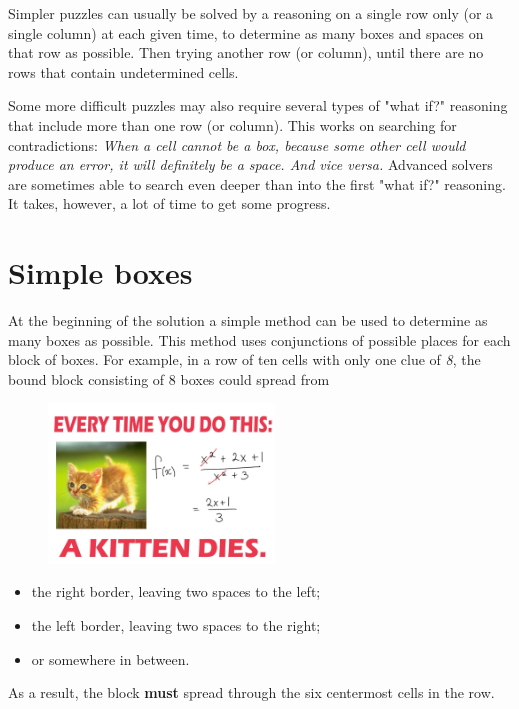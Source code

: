 Simpler puzzles can usually be solved by a reasoning on a single row only (or a single column) at each given time, to determine as many boxes and spaces on that row as possible. Then trying another row (or column), until there are no rows that contain undetermined cells.

Some more difficult puzzles may also require several types of "what if?" reasoning that include more than one row (or column). This works on searching for contradictions: \textit{When a cell cannot be a box, because some other cell would produce an error, it will definitely be a space. And vice versa.} Advanced solvers are sometimes able to search even deeper than into the first "what if?" reasoning. It takes, however, a lot of time to get some progress.


\section{Simple boxes}
At the beginning of the solution a simple method can be used to determine as many boxes as possible. This method uses conjunctions of possible places for each block of boxes. For example, in a row of ten cells with only one clue of \textit{8}, the bound block consisting of 8 boxes could spread from
\begin{figure}
\centering
\includegraphics[width=6cm]{picture/obr.jpg}
\end{figure}

\begin{itemize} 
 \item {the right border, leaving two spaces to the left;}

\item {the left border, leaving two spaces to the right;}

\item {or somewhere in between.} 
\end{itemize}

As a result, the block \textbf{must} spread through the six centermost cells in the row.

